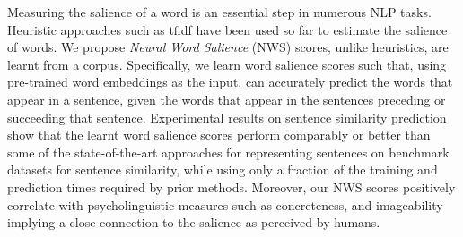 Measuring the salience of a word is an essential step in numerous NLP tasks. Heuristic approaches such as tfidf have been used so far to estimate the salience of words. We propose \emph{Neural Word Salience} (NWS) scores, unlike heuristics, are learnt from a corpus. Specifically, we learn word salience scores such that, using pre-trained word embeddings as the input, can accurately predict the words that appear in a sentence, given the words that appear in the sentences preceding or succeeding that sentence. Experimental results on sentence similarity prediction show that the learnt word salience scores perform comparably or better than some of the state-of-the-art approaches for representing sentences on benchmark datasets for sentence similarity, while using only a fraction of the training and prediction times required by prior methods. Moreover, our NWS scores positively correlate with psycholinguistic measures such as concreteness, and imageability implying a close connection to the salience as perceived by humans.
